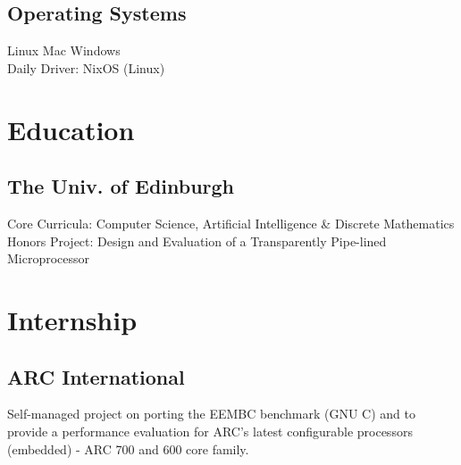 \documentclass[]{cv}
\begin{document}
\begin{minipage}[t]{0.25\textwidth}
\subsection{Operating Systems}\label{subsec:operating-systems}
\sectionsep
Linux
\textbullet{} Mac
\textbullet{} Windows \\
Daily Driver: NixOS (Linux)

\section{Education}\label{sec:education}
\subsection{The Univ. of Edinburgh}\label{subsec:the-university-of-edinburgh}
Core Curricula: Computer Science, Artificial Intelligence \& Discrete Mathematics \\
Honors Project: Design and Evaluation of a Transparently Pipe-lined Microprocessor

\section{Internship}\label{sec:internship}
\subsection{ARC International}\label{subsec:arc-international}
Self-managed project on porting the EEMBC benchmark (GNU C) and to provide a performance evaluation for ARC’s latest configurable processors (embedded) - ARC 700 and 600 core family.

\end{minipage}
\end{document}
